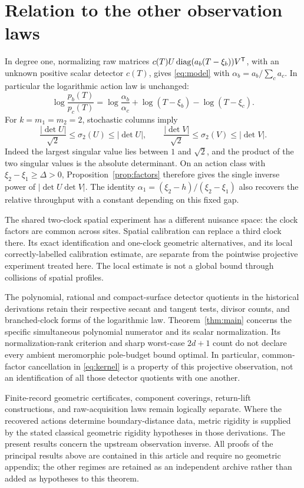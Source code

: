 \section{Relation to the other observation laws}
\label{sec:relations}
In degree one, normalizing raw matrices
$c(T)U\operatorname{diag}(a_b(T-\xi_b))V^{\mathsf T}$, with an unknown positive
scalar detector $c(T)$, gives \eqref{eq:model} with
$\alpha_b=a_b/\sum_ca_c$. In particular the logarithmic action law
is unchanged:
\[
 \log\frac{p_b(T)}{p_c(T)}
   =\log\frac{\alpha_b}{\alpha_c}+\log(T-\xi_b)-\log(T-\xi_c).
\]
For $k=m_1=m_2=2$, stochastic columns imply
\[
 \frac{|\det U|}{\sqrt2}\le\sigma_2(U)\le|\det U|,
 \qquad
 \frac{|\det V|}{\sqrt2}\le\sigma_2(V)\le|\det V|.
\]
Indeed the largest singular value lies between $1$ and $\sqrt2$,
and the product of the two singular values is the absolute determinant.
On an action class with $\xi_2-\xi_1\ge\Delta>0$,
Proposition~\ref{prop:factors} therefore gives the single inverse
power of $|\det U\det V|$. The identity
$\alpha_1=(\xi_2-h)/(\xi_2-\xi_1)$ also recovers the relative
throughput with a constant depending on this fixed gap.

The shared two-clock spatial experiment has a different nuisance
space: the clock factors are common across sites. Spatial calibration
can replace a third clock there. Its exact identification and
one-clock geometric alternatives, and its local correctly-labelled
calibration estimate, are separate from the pointwise projective
experiment treated here. The local estimate is not a global bound
through collisions of spatial profiles.

The polynomial, rational and compact-surface detector quotients in
the historical derivations retain their respective secant and tangent
tests, divisor counts, and branched-clock forms of the logarithmic law.
Theorem~\ref{thm:main} concerns the specific simultaneous polynomial
numerator and its scalar normalization. Its normalization-rank
criterion and sharp worst-case $2d+1$ count do not declare every
ambient meromorphic pole-budget bound optimal. In particular,
common-factor cancellation in \eqref{eq:kernel} is a property of this
projective observation, not an identification of all those detector
quotients with one another.

Finite-record geometric certificates, component coverings,
return-lift constructions, and raw-acquisition laws remain logically
separate. Where the recovered actions determine boundary-distance data,
metric rigidity is supplied by the stated classical geometric
rigidity hypotheses in those derivations. The present results concern
the upstream observation inverse. All proofs of the principal results
above are contained in this article and require no geometric appendix;
the other regimes are retained as an independent archive rather than
added as hypotheses to this theorem.

